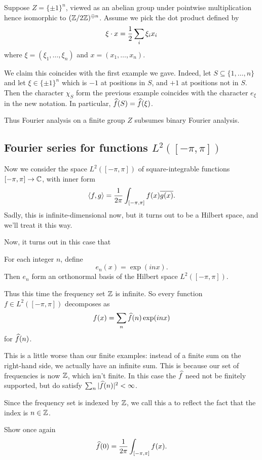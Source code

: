 \begin{example}
	Suppose $Z = \{\pm 1\}^n$, viewed as an abelian group
	under pointwise multiplication
	hence isomorphic to $(\mathbb Z/2\mathbb Z)^{\oplus n}$.
	Assume we pick the dot product defined by
	\[ \xi \cdot x = \frac{1}{2} \sum_i \xi_i x_i \]
	where $\xi = (\xi_1, \dots, \xi_n)$ and $x = (x_1, \dots, x_n)$.

	We claim this coincides with the first example we gave.
	Indeed, let $S \subseteq \{1, \dots, n\}$
	and let $\xi \in \{\pm1\}^n$ which is $-1$ at positions in $S$,
	and $+1$ at positions not in $S$.
	Then the character $\chi_S$ form the previous example
	coincides with the character $e_\xi$ in the new notation.
	In particular, $\widehat f(S) = \widehat f(\xi)$.

	Thus Fourier analysis on a finite group $Z$ subsumes
	binary Fourier analysis.
\end{example}

\subsection{Fourier series for functions $L^2([-\pi, \pi])$}
Now we consider the space $L^2([-\pi, \pi])$ of
square-integrable functions $[-\pi, \pi] \to \mathbb C$, with inner form
\[ \left< f,g \right> = \frac{1}{2\pi} \int_{[-\pi, \pi]} f(x) \overline{g(x)}. \]
Sadly, this is infinite-dimensional now,
but it turns out to be a Hilbert space, and we'll treat it this way.

Now, it turns out in this case that
\begin{theorem}
	For each integer $n$, define
	\[ e_n(x) = \exp(inx). \]
	Then $e_n$ form an orthonormal basis
	of the Hilbert space $L^2([-\pi, \pi])$.
\end{theorem}
Thus this time the frequency set $\mathbb Z$ is infinite.
So every function $f \in L^2([-\pi, \pi])$ decomposes as
\[ f(x) = \sum_n \widehat f(n) \exp(inx) \]
for $\widehat f(n)$.

This is a little worse than our finite examples:
instead of a finite sum on the right-hand side,
we actually have an infinite sum.
This is because our set of frequencies is now $\mathbb Z$, which isn't finite.
In this case the $\widehat f$ need not be finitely supported,
but do satisfy $\sum_n |\widehat f(n)|^2 < \infty$.

Since the frequency set is indexed by $\mathbb Z$,
we call this a 
to reflect the fact that the index is $n \in \mathbb Z$.

\begin{exercise}
	Show once again 
	\[ \widehat f(0) = \frac{1}{2\pi} \int_{[-\pi, \pi]} f(x). \]
\end{exercise}

